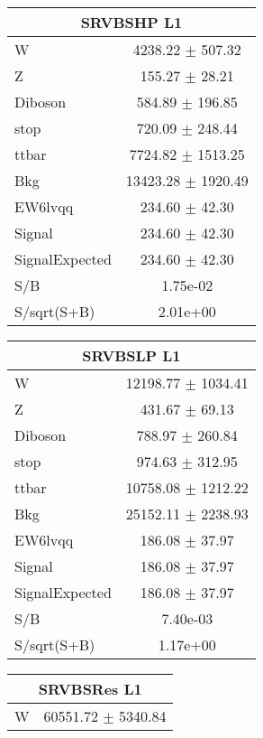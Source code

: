 \begin{table}
\centering
\begin{tabular}{|l|c|}
\hline
\multicolumn{2}{|c|}{SRVBSHP L1}\\ \hline
W & 4238.22 $\pm$ 507.32\\
Z & 155.27 $\pm$ 28.21\\
Diboson & 584.89 $\pm$ 196.85\\
stop & 720.09 $\pm$ 248.44\\
ttbar & 7724.82 $\pm$ 1513.25\\
\hline
Bkg & 13423.28 $\pm$ 1920.49\\
\hline
EW6lvqq & 234.60 $\pm$ 42.30\\
\hline
Signal & 234.60 $\pm$ 42.30\\
SignalExpected & 234.60 $\pm$ 42.30\\
\hline
S/B & 1.75e-02\\
S/sqrt(S+B) & 2.01e+00\\ 
\hline
\end{tabular}
\begin{tabular}{|l|c|}
\hline
\multicolumn{2}{|c|}{SRVBSLP L1}\\ \hline
W & 12198.77 $\pm$ 1034.41\\
Z & 431.67 $\pm$ 69.13\\
Diboson & 788.97 $\pm$ 260.84\\
stop & 974.63 $\pm$ 312.95\\
ttbar & 10758.08 $\pm$ 1212.22\\
\hline
Bkg & 25152.11 $\pm$ 2238.93\\
\hline
EW6lvqq & 186.08 $\pm$ 37.97\\
\hline
Signal & 186.08 $\pm$ 37.97\\
SignalExpected & 186.08 $\pm$ 37.97\\
\hline
S/B & 7.40e-03\\
S/sqrt(S+B) & 1.17e+00\\
\hline
\end{tabular}
\begin{tabular}{|l|c|}
\hline
\multicolumn{2}{|c|}{SRVBSRes L1}\\ \hline
W & 60551.72 $\pm$ 5340.84\\

\end{tabular}
\end{table}
